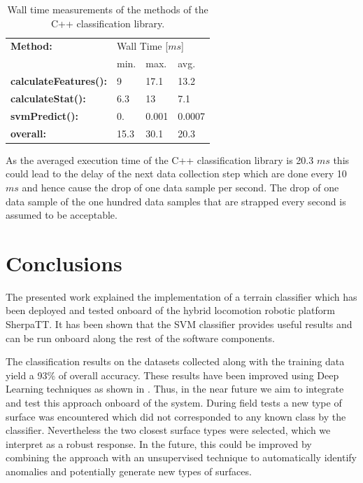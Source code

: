 \documentclass{article}
\begin{document}
\begin{table}[!htb]
   \centering
    \begin{tabularx}{\columnwidth}{X|XXX}
        \textbf{Method:} & \multicolumn{3}{X}{Wall Time [$ms$]} \\
        &min.&max.&avg.\\
        \hline
        \hline
        \textbf{calculateFeatures():} & 9&  17.1& 13.2 \\
        \textbf{calculateStat():}     & 6.3 & 13 & 7.1 \\
        \textbf{svmPredict():}        &  0. &  0.001 & 0.0007  \\
        \hline
        \textbf{overall:}             & 15.3 & 30.1 &20.3  \\
    \end{tabularx}	
    \caption{Wall time measurements of the methods of the C++ classification library.}
    \label{table:compmeasurments}
\end{table}

As the averaged execution time of the C++ classification library is 20.3 $ms$ this could lead to the delay of the next data collection step which are done every 10 $ms$ and hence cause the drop of one data sample per second. The drop of one data sample of the one hundred data samples that are strapped every second is assumed to be acceptable.


\section{Conclusions}

The presented work explained the implementation of a terrain classifier which has been deployed and tested onboard of the hybrid locomotion robotic platform SherpaTT.
It has been shown that the SVM classifier provides useful results and can be run onboard along the rest of the software components.

The classification results on the datasets collected along with the training data yield a 93\% of overall accuracy. 
These results have been improved using Deep Learning techniques as shown in \cite{ugenti2021}. 
Thus, in the near future we aim to integrate and test this approach onboard of the system.
During field tests a new type of surface was encountered which did not corresponded to any known class by the classifier. 
Nevertheless the two closest surface types were selected, which we interpret as a robust response.
In the future, this could be improved by combining the approach with an unsupervised technique to automatically identify anomalies and potentially generate new types of surfaces.
\end{document}
